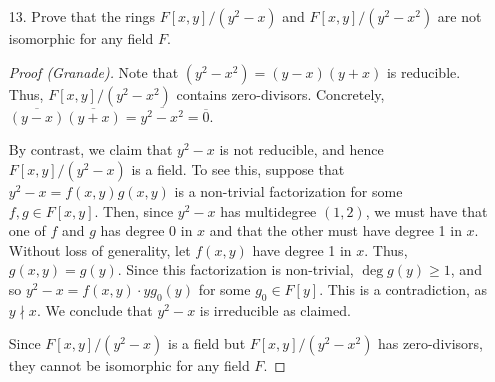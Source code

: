 \documentclass[10pt]{article}
\begin{document}
\begin{itemize}
\begin{proof}
First we collect all the terms on the right side of the equation
that have an $x_1$ in them.  After factoring out the $x_1$ term from
these, we have $c_1x_1$ such that

$$ \Sigma _{i=1}^{n} g_ip_i - c_1x_1$$

where $\Sigma_{i=1}^{n}g_ip_i - c_1x_1$ no longer contains the
variable $x_1$.  We continue doing this again for the next variable
$x_2$ which results in $\Sigma _{i=1}^{n} g_ip_i - c_2x_2 - c_1x_1$.
Notice that $\Sigma _{i=1}^{n} g_ip_i - c_2x_2 - c_1x_1$ no longer
contains the variables $x_1$ or $x_2$.  We follow the same procedure
for $x_3$ (which results in $ \Sigma _{i=1}^{n} g_ip_i - c_3x_3 -
c_2x_2 - c_1x_1$) and so on until we have finished the process with
$x_k$.  Then we have

$$x_{k+1}=\Sigma_{i=1}^{n} g_ip_i=c_1x_1+c_2x_2+...+c_kx_k.$$

But we realize that on the left most side of the equation there are
no terms with $x_1$ and therefore $c_1=0$.  This is true for all
$x_i$ with $i=\lbrace1,2,...,k\rbrace$ and therefore $c_i=0$ for
$i=\lbrace1,2,...,k\rbrace$.  But then $x_{k+1}=0$ and we have a
contradiction.  Therefore a polynomial ring in infinitely many
variables with coefficients in any commutatitive ring contains
ideals that are not finitely generated.


\end{proof}

\item [13.] Prove that the rings $F\left[x,y\right]/\left(y^{2}-x\right)$
and $F\left[x,y\right]/\left(y^{2}-x^{2}\right)$ are not isomorphic
for any field $F$.

\begin{proof}[Proof (Granade)]
Note that
$\left(y^{2}-x^{2}\right)=\left(y-x\right)\left(y+x\right)$ is
reducible. Thus, $F\left[x,y\right]/\left(y^{2}-x^{2}\right)$
contains zero-divisors. Concretely,
$\overline{\left(y-x\right)}\overline{\left(y+x\right)}=\overline{y^{2}-x^{2}}=\overline{0}$.

By contrast, we claim that $y^{2}-x$ is not reducible, and hence
$F\left[x,y\right]/\left(y^{2}-x\right)$ is a field. To see this,
suppose that $y^{2}-x=f\left(x,y\right)g\left(x,y\right)$ is a
non-trivial factorization for some $f,g\in F\left[x,y\right]$. Then,
since $y^{2}-x$ has multidegree $\left(1,2\right)$, we must have
that one of $f$ and $g$ has degree $ $$0$ in $x$ and that the other
must have degree 1 in $x$. Without loss of generality, let
$f\left(x,y\right)$ have degree 1 in $x$. Thus,
$g\left(x,y\right)=g\left(y\right)$. Since this factorization is
non-trivial, $\deg g\left(y\right)\ge1$, and so
$y^{2}-x=f\left(x,y\right)\cdot yg_{0}\left(y\right)$ for some
$g_{0}\in F\left[y\right]$. This is a contradiction, as $y\nmid x$.
We conclude that $y^{2}-x$ is irreducible as claimed.

Since $F\left[x,y\right]/\left(y^{2}-x\right)$ is a field but
$F\left[x,y\right]/\left(y^{2}-x^{2}\right)$ has zero-divisors, they
cannot be isomorphic for any field $F$.
\end{proof}

\end{itemize}
\end{document}
